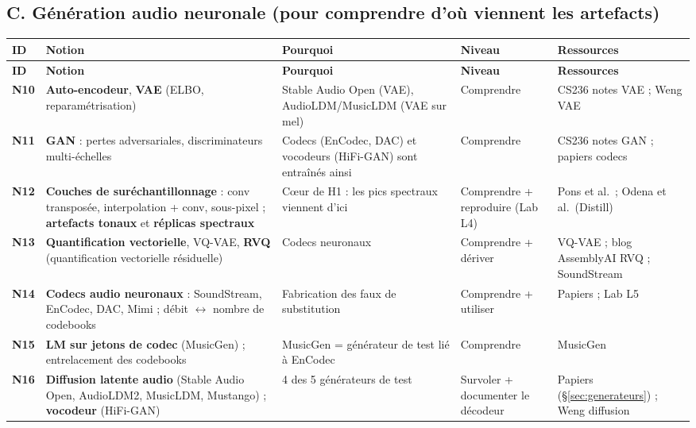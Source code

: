 \documentclass[11pt,a4paper]{article}
\providecommand{\og}{\guillemotleft\nobreakspace}%
\providecommand{\fg}{\nobreakspace\guillemotright}}
\begin{document}
\subsection{C. Génération audio neuronale (pour comprendre d'où viennent les artefacts)}
{\footnotesize
\begin{longtable}{L{0.95cm}L{4.1cm}L{4.6cm}L{2.2cm}L{3.3cm}}
\toprule
\textbf{ID} & \textbf{Notion} & \textbf{Pourquoi} & \textbf{Niveau} & \textbf{Ressources}\\
\midrule
\endfirsthead
\toprule
\textbf{ID} & \textbf{Notion} & \textbf{Pourquoi} & \textbf{Niveau} & \textbf{Ressources}\\
\midrule
\endhead
\bottomrule
\endfoot
\textbf{N10} & \textbf{Auto-encodeur}, \textbf{VAE} (ELBO, reparamétrisation) & Stable Audio Open (VAE), AudioLDM/MusicLDM (VAE sur mel) & Comprendre & CS236 notes VAE ; Weng VAE\\
\addlinespace
\textbf{N11} & \textbf{GAN} : pertes adversariales, discriminateurs multi-échelles & Codecs (EnCodec, DAC) et vocodeurs (HiFi-GAN) sont entraînés ainsi & Comprendre & CS236 notes GAN ; papiers codecs\\
\addlinespace
\textbf{N12} & \textbf{Couches de suréchantillonnage} : conv transposée, interpolation + conv, sous-pixel ; \textbf{artefacts tonaux} et \textbf{réplicas spectraux} & Cœur de H1 : les \og{}pics spectraux\fg{} viennent d'ici & Comprendre + reproduire (Lab L4) & Pons et al.\ ; Odena et al.\ (Distill)\\
\addlinespace
\textbf{N13} & \textbf{Quantification vectorielle}, VQ-VAE, \textbf{RVQ} (quantification vectorielle résiduelle) & Codecs neuronaux & Comprendre + dériver & VQ-VAE ; blog AssemblyAI RVQ ; SoundStream\\
\addlinespace
\textbf{N14} & \textbf{Codecs audio neuronaux} : SoundStream, EnCodec, DAC, Mimi ; débit $\leftrightarrow$ nombre de codebooks & Fabrication des faux de substitution & Comprendre + utiliser & Papiers ; Lab L5\\
\addlinespace
\textbf{N15} & \textbf{LM sur jetons de codec} (MusicGen) ; entrelacement des codebooks & MusicGen = générateur de test lié à EnCodec & Comprendre & MusicGen\\
\addlinespace
\textbf{N16} & \textbf{Diffusion latente audio} (Stable Audio Open, AudioLDM2, MusicLDM, Mustango) ; \textbf{vocodeur} (HiFi-GAN) & 4 des 5 générateurs de test & Survoler + documenter le décodeur & Papiers (§\ref{sec:generateurs}) ; Weng diffusion\\
\end{longtable}}
\end{document}
